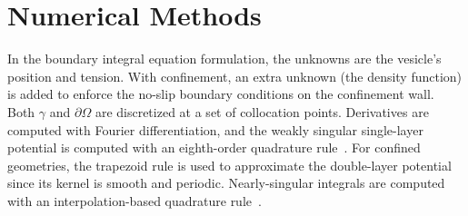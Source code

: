 \documentclass[prb,preprint,showpacs,preprintnumbers,amsmath,amssymb,longbibliography]{revtex4-1}
\begin{document}
\section{Numerical Methods}
\label{sec:numerics}
In the  boundary integral equation formulation, the unknowns are the
vesicle's position and tension. With confinement, an extra unknown (the
density function) is added to enforce the no-slip boundary conditions on
the confinement wall. Both $\gamma$ and $\partial\Omega$ are discretized
at a set of collocation points. Derivatives are computed with Fourier
differentiation, and the weakly singular single-layer potential is
computed with an eighth-order quadrature rule~\cite{alp1999}. For
confined geometries, the trapezoid rule is used to approximate the
double-layer potential since its kernel is smooth and periodic.
Nearly-singular integrals are computed with an interpolation-based
quadrature rule~\cite{qua-bir2014}.
\end{document}
